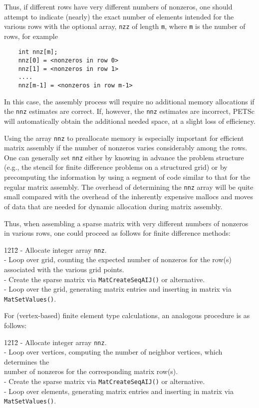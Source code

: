 Thus, if different rows have very different numbers of nonzeros, one
should attempt to indicate (nearly) the exact number of elements
intended for the various rows with the optional array, {\tt nzz} of
length {\tt m}, where {\tt m} is the number of rows, for example
  \begin{verbatim}
    int nnz[m];
    nnz[0] = <nonzeros in row 0>
    nnz[1] = <nonzeros in row 1>
    ....
    nnz[m-1] = <nonzeros in row m-1>
  \end{verbatim}
In this case, the assembly process will require no additional memory
allocations if the {\tt nnz} estimates are correct. If, however,
the {\tt nnz} estimates are incorrect, PETSc will automatically
obtain the additional needed space, at a slight loss of efficiency.

Using the array {\tt nnz} to preallocate memory is especially
important for efficient matrix assembly if the number of nonzeros
varies considerably among the rows.  One can generally set {\tt nnz}
either by knowing in advance the problem structure (e.g., the stencil
for finite difference problems on a structured grid) or by
precomputing the information by using a segment of code similar to
that for the regular matrix assembly.  The overhead of determining the
{\tt nnz} array will be quite small compared with the overhead of the
inherently expensive mallocs and moves of data that are needed for
dynamic allocation during matrix assembly.

Thus, when assembling a sparse matrix with very different
numbers of nonzeros in various rows, one could proceed 
as follows for finite difference methods:
\begin{tabbing}
12\=12\= \kill
    \> - Allocate integer array {\tt nnz}.\\
    \> - Loop over grid, counting the expected number of nonzeros for the row(s)\\
    \>\>  associated with the various grid points.\\
    \> - Create the sparse matrix via {\tt MatCreateSeqAIJ()} or alternative.\\
    \> - Loop over the grid, generating matrix entries and inserting 
      in matrix via {\tt MatSetValues()}.\\
  \end{tabbing}
\vspace{-0.2in}
For (vertex-based) finite element type calculations, an analogous procedure is as follows:
  \begin{tabbing}
12\=12\= \kill
    \> - Allocate integer array {\tt nnz}.\\
    \>- Loop over vertices, computing the number of neighbor vertices, which determines the\\
    \>\> number of nonzeros for the corresponding matrix row(s).\\
    \> - Create the sparse matrix via {\tt MatCreateSeqAIJ()} or alternative.\\
    \> - Loop over elements, generating matrix entries and inserting
      in matrix via {\tt MatSetValues()}.\\
  \end{tabbing}

